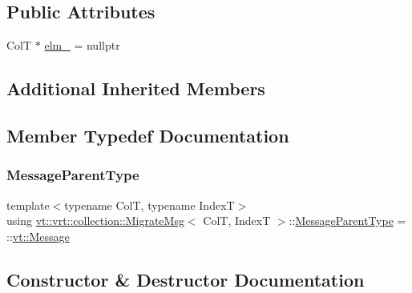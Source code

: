 \subsection*{Public Attributes}
\begin{DoxyCompactItemize}
\item 
ColT $\ast$ \hyperlink{structvt_1_1vrt_1_1collection_1_1_migrate_msg_aa074fd362c469f1a0aae30d1cf9888bf}{elm\+\_\+} = nullptr
\end{DoxyCompactItemize}
\subsection*{Additional Inherited Members}


\subsection{Member Typedef Documentation}
\mbox{\label{structvt_1_1vrt_1_1collection_1_1_migrate_msg_a3453db7704db7db17a7afef046dba844}} 
\subsubsection{\texorpdfstring{Message\+Parent\+Type}{MessageParentType}}
{\footnotesize\ttfamily template$<$typename ColT, typename IndexT$>$ \\
using \hyperlink{structvt_1_1vrt_1_1collection_1_1_migrate_msg}{vt\+::vrt\+::collection\+::\+Migrate\+Msg}$<$ ColT, IndexT $>$\+::\hyperlink{structvt_1_1messaging_1_1_active_msg_ac2e6d93267991027ce78c968b17064c7}{Message\+Parent\+Type} =  \+::\hyperlink{namespacevt_a3a3ddfef40b4c90915fa43cdd5f129ea}{vt\+::\+Message}}



\subsection{Constructor \& Destructor Documentation}
\mbox{\label{structvt_1_1vrt_1_1collection_1_1_migrate_msg_a0b41c5d241e067dadb4648653f9909bc}} 
